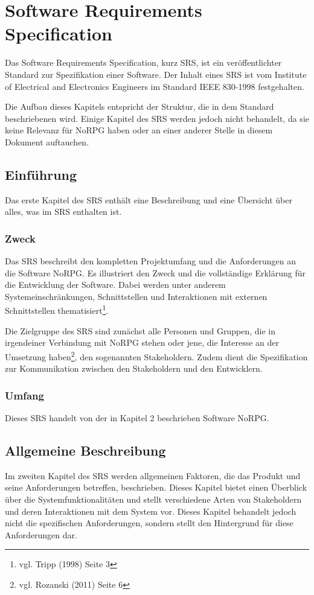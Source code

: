 \chapter{Software Requirements Specification}
	Das Software Requirements Specification, kurz SRS, ist ein veröffentlichter Standard zur Spezifikation einer Software. Der Inhalt eines SRS ist vom Institute of Electrical and Electronics Engineers im Standard IEEE 830-1998 festgehalten.
	
	Die Aufbau dieses Kapitels entspricht der Struktur, die in dem Standard beschriebenen wird. Einige Kapitel des SRS werden jedoch nicht behandelt, da sie keine Relevanz für NoRPG haben oder an einer anderer Stelle in diesem Dokument auftauchen.
	
\section{Einführung}
	Das erste Kapitel des SRS enthält eine Beschreibung und eine Übersicht über alles, was im SRS enthalten ist.
	
	\subsection{Zweck}
		Das SRS beschreibt den kompletten Projektumfang und die Anforderungen an die Software NoRPG. Es illustriert den Zweck und die vollständige Erklärung für die Entwicklung der Software. Dabei werden unter anderem Systemeinschränkungen, Schnittstellen und Interaktionen mit externen Schnittstellen thematisiert\footnote{vgl. Tripp \cite{srsIEEE}(1998) Seite 3}. 
	
		Die Zielgruppe des SRS sind zunächst alle Personen und Gruppen, die in irgendeiner Verbindung mit NoRPG stehen oder jene, die Interesse an der Umsetzung haben\footnote{vgl. Rozanski \cite{rozanski2011}(2011) Seite 6}, den sogenannten Stakeholdern. Zudem dient die Spezifikation zur Kommunikation zwischen den Stakeholdern und den Entwicklern.
		
	\subsection{Umfang}
		Dieses SRS handelt von der in Kapitel 2 beschrieben Software NoRPG. 
		
\section{Allgemeine Beschreibung}
	Im zweiten Kapitel des SRS werden allgemeinen Faktoren, die das Produkt und seine Anforderungen betreffen, beschrieben. Dieses Kapitel bietet einen Überblick über die Systemfunktionalitäten und stellt verschiedene Arten von Stakeholdern und deren Interaktionen mit dem System vor. Dieses Kapitel behandelt jedoch nicht die spezifischen Anforderungen, sondern stellt den Hintergrund für diese Anforderungen dar. 


